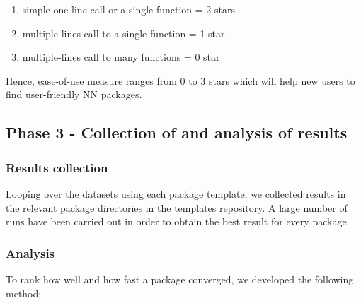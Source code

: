 \begin{enumerate}
  \begin{enumerate}
  \def\labelenumii{\alph{enumii}.}
  \tightlist
  \item
    simple one-line call or a single function = 2 stars
  \item
    multiple-lines call to a single function = 1 star
  \item
    multiple-lines call to many functions = 0 star
  \end{enumerate}
\end{enumerate}

Hence, ease-of-use measure ranges from 0 to 3 stars which will help new
users to find user-friendly NN packages.

\hypertarget{phase-3---collection-of-and-analysis-of-results}{%
\subsection{Phase 3 - Collection of and analysis of
results}\label{phase-3---collection-of-and-analysis-of-results}}

\hypertarget{results-collection}{%
\subsubsection{Results collection}\label{results-collection}}

Looping over the datasets using each package template, we collected
results in the relevant package directories in the templates repository.
A large number of runs have been carried out in order to obtain the best
result for every package.

\hypertarget{analysis}{%
\subsubsection{Analysis}\label{analysis}}

To rank how well and how fast a package converged, we developed the
following method:

